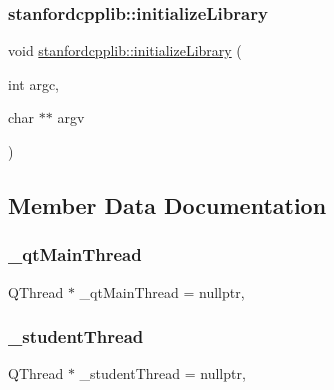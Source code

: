 \subsubsection{\texorpdfstring{stanfordcpplib\+::initialize\+Library}{stanfordcpplib::initializeLibrary}}
{\footnotesize\ttfamily void \mbox{\hyperlink{namespacestanfordcpplib_ab36f2e19ed11765f2b025cc8e4636010}{stanfordcpplib\+::initialize\+Library}} (\begin{DoxyParamCaption}\item[{int}]{argc,  }\item[{char $\ast$$\ast$}]{argv }\end{DoxyParamCaption})\hspace{0.3cm}{\ttfamily [friend]}}



\subsection{Member Data Documentation}
\mbox{\label{classGThread_aa69140e62a4dad275e74a6c1174eb4e5}} 
\subsubsection{\texorpdfstring{\+\_\+qt\+Main\+Thread}{\_qtMainThread}}
{\footnotesize\ttfamily Q\+Thread $\ast$ \+\_\+qt\+Main\+Thread = nullptr\hspace{0.3cm}{\ttfamily [static]}, {\ttfamily [protected]}}

\mbox{\label{classGThread_a15ae7c95a54d17d2c307ebba42fe3405}} 
\subsubsection{\texorpdfstring{\+\_\+student\+Thread}{\_studentThread}}
{\footnotesize\ttfamily Q\+Thread $\ast$ \+\_\+student\+Thread = nullptr\hspace{0.3cm}{\ttfamily [static]}, {\ttfamily [protected]}}

